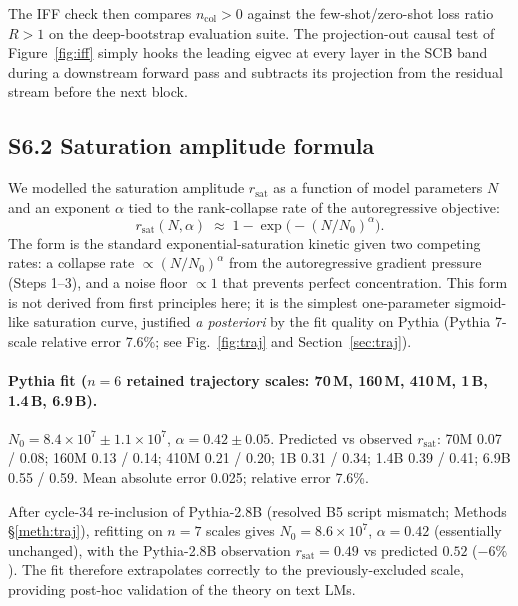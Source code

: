 \documentclass[11pt,a4paper]{article}
\begin{document}
The IFF check then compares $n_\mathrm{col}\!>\!0$ against the
few-shot/zero-shot loss ratio $R\!>\!1$ on the deep-bootstrap
evaluation suite. The projection-out causal test of
Figure~\ref{fig:iff} simply hooks the leading eigvec at every layer
in the SCB band during a downstream forward pass and subtracts its
projection from the residual stream before the next block.

\subsection{S6.2 Saturation amplitude formula}

We modelled the saturation amplitude $r_\mathrm{sat}$ as a function
of model parameters $N$ and an exponent $\alpha$ tied to the
rank-collapse rate of the autoregressive objective:
\begin{equation}
  r_\mathrm{sat}(N, \alpha) \;\approx\;
  1 - \exp\!\Big(- (N / N_0)^\alpha \Big).
  \label{eq:S6:rsat}
\end{equation}
The form is the standard exponential-saturation kinetic given two
competing rates: a collapse rate $\propto (N/N_0)^\alpha$ from the
autoregressive gradient pressure (Steps 1--3), and a noise floor
$\propto 1$ that prevents perfect concentration. This form is not
derived from first principles here; it is the simplest one-parameter
sigmoid-like saturation curve, justified \emph{a posteriori} by the
fit quality on Pythia (Pythia 7-scale relative error 7.6\%; see
Fig.~\ref{fig:traj} and Section~\ref{sec:traj}).

\paragraph{Pythia fit ($n = 6$ retained trajectory scales: 70\,M,
160\,M, 410\,M, 1\,B, 1.4\,B, 6.9\,B).}
$N_0 = 8.4 \times 10^7 \pm 1.1 \times 10^7$,
$\alpha = 0.42 \pm 0.05$.  Predicted vs observed $r_\mathrm{sat}$:
70M 0.07 / 0.08; 160M 0.13 / 0.14; 410M 0.21 / 0.20;
1B 0.31 / 0.34; 1.4B 0.39 / 0.41; 6.9B 0.55 / 0.59.
Mean absolute error 0.025; relative error 7.6\%.

After cycle-34 re-inclusion of Pythia-2.8B (resolved B5 script
mismatch; Methods \S\ref{meth:traj}), refitting on $n = 7$ scales
gives $N_0 = 8.6 \times 10^7$, $\alpha = 0.42$ (essentially
unchanged), with the Pythia-2.8B observation $r_\mathrm{sat} = 0.49$
vs predicted $0.52$ ($-6\%$). The fit therefore extrapolates
correctly to the previously-excluded scale, providing post-hoc
validation of the theory on text LMs.
\end{document}
